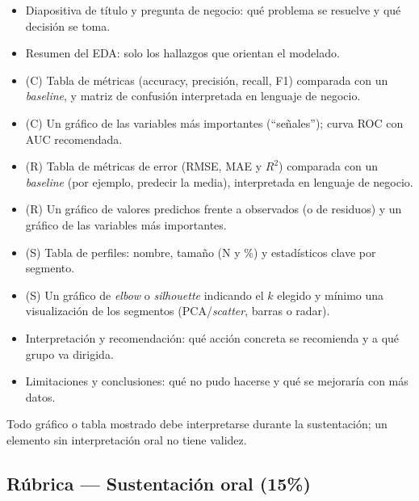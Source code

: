 \documentclass[11pt,letterpaper]{article}
\begin{document}
\begin{itemize}
  \item Diapositiva de título y pregunta de negocio: qué problema se resuelve y qué decisión se toma.
  \item Resumen del EDA: solo los hallazgos que orientan el modelado.
  \item (C) Tabla de métricas (accuracy, precisión, recall, F1) comparada con un \textit{baseline}, y matriz de confusión interpretada en lenguaje de negocio.
  \item (C) Un gráfico de las variables más importantes (``señales''); curva ROC con AUC recomendada.
  \item (R) Tabla de métricas de error (RMSE, MAE y $R^2$) comparada con un \textit{baseline} (por ejemplo, predecir la media), interpretada en lenguaje de negocio.
  \item (R) Un gráfico de valores predichos frente a observados (o de residuos) y un gráfico de las variables más importantes.
  \item (S) Tabla de perfiles: nombre, tamaño (N y \%) y estadísticos clave por segmento.
  \item (S) Un gráfico de \textit{elbow} o \textit{silhouette} indicando el $k$ elegido y mínimo una visualización de los segmentos (PCA/\textit{scatter}, barras o radar).
  \item Interpretación y recomendación: qué acción concreta se recomienda y a qué grupo va dirigida.
  \item Limitaciones y conclusiones: qué no pudo hacerse y qué se mejoraría con más datos.
\end{itemize}

Todo gráfico o tabla mostrado debe interpretarse durante la sustentación; un elemento sin interpretación oral no tiene validez.

\subsection{Rúbrica --- Sustentación oral (15\%)}
\end{document}
